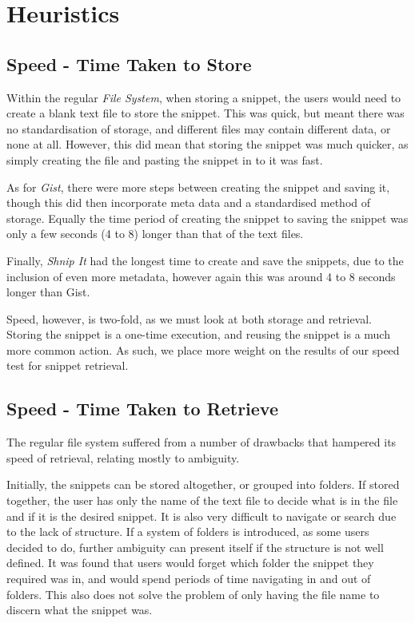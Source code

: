 \section{Heuristics}

\subsection{Speed - Time Taken to Store} \label{storespeed}
Within the regular \textit{File System}, when storing a snippet, the users would need to create a blank text file to store the snippet. This was quick, but meant there was no standardisation of storage, and different files may contain different data, or none at all. 
However, this did mean that storing the snippet was much quicker, as simply creating the file and pasting the snippet in to it was fast.

As for \textit{Gist}, there were more steps between creating the snippet and saving it, though this did then incorporate meta data and a standardised method of storage. 
Equally the time period of creating the snippet to saving the snippet was only a few seconds (4 to 8) longer than that of the text files.

Finally, \textit{Shnip It} had the longest time to create and save the snippets, due to the inclusion of even more metadata, however again this was around 4 to 8 seconds longer than Gist.

Speed, however, is two-fold, as we must look at both storage and retrieval. 
Storing the snippet is a one-time execution, and reusing the snippet is a much more common action.
As such, we place more weight on the results of our speed test for snippet retrieval.

\subsection{Speed - Time Taken to Retrieve} \label{speedretrieve}
The regular file system suffered from a number of drawbacks that hampered its speed of retrieval, relating mostly to ambiguity.

Initially, the snippets can be stored altogether, or grouped into folders.
If stored together, the user has only the name of the text file to decide what is in the file and if it is the desired snippet.
It is also very difficult to navigate or search due to the lack of structure.
If a system of folders is introduced, as some users decided to do, further ambiguity can present itself if the structure is not well defined.
It was found that users would forget which folder the snippet they required was in, and would spend periods of time navigating in and out of folders. 
This also does not solve the problem of only having the file name to discern what the snippet was.

